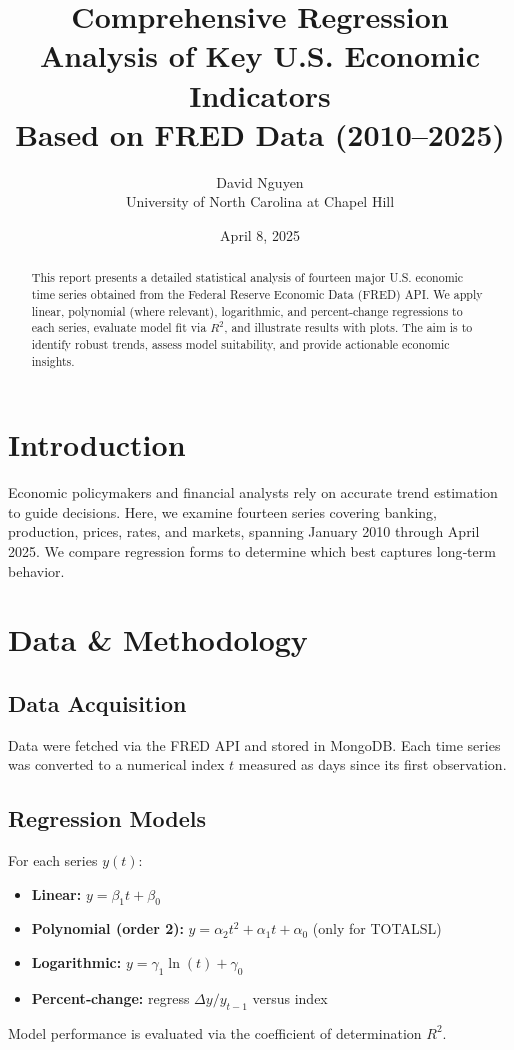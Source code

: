 \documentclass[11pt,a4paper]{article}
\title{Comprehensive Regression Analysis of Key U.S. Economic Indicators\\
\large Based on FRED Data (2010–2025)}
\author{David Nguyen \\ University of North Carolina at Chapel Hill}
\date{April 8, 2025}
\begin{document}
\maketitle

\begin{abstract}
  This report presents a detailed statistical analysis of fourteen major U.S. economic time series obtained from the Federal Reserve Economic Data (FRED) API. We apply linear, polynomial (where relevant), logarithmic, and percent‐change regressions to each series, evaluate model fit via \(R^2\), and illustrate results with plots. The aim is to identify robust trends, assess model suitability, and provide actionable economic insights.
\end{abstract}

\tableofcontents
\clearpage

\section{Introduction}
Economic policymakers and financial analysts rely on accurate trend estimation to guide decisions. Here, we examine fourteen series covering banking, production, prices, rates, and markets, spanning January 2010 through April 2025. We compare regression forms to determine which best captures long‐term behavior.

\section{Data \& Methodology}
\subsection{Data Acquisition}
Data were fetched via the FRED API and stored in MongoDB. Each time series was converted to a numerical index \(t\) measured as days since its first observation.

\subsection{Regression Models}
For each series \(y(t)\):
\begin{itemize}
  \item \textbf{Linear:} \(y = \beta_1 t + \beta_0\)
  \item \textbf{Polynomial (order 2):} \(y = \alpha_2 t^2 + \alpha_1 t + \alpha_0\) (only for TOTALSL)
  \item \textbf{Logarithmic:} \(y = \gamma_1 \ln(t) + \gamma_0\)
  \item \textbf{Percent‐change:} regress \(\Delta y / y_{t-1}\) versus index
\end{itemize}
Model performance is evaluated via the coefficient of determination \(R^2\).
\end{document}
